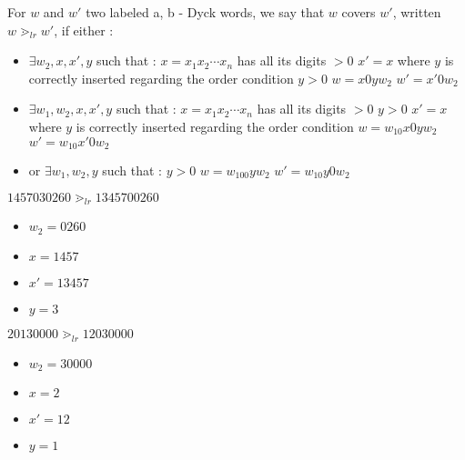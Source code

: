 \begin{definition}[$\gtrdot_{lr}$]
    For $w$ and $w'$ two labeled a, b - Dyck words, we say
    that $w$ covers $w'$, written $w \gtrdot_{lr} w'$,
    if either :
    \begin{itemize}
        \item $\exists w_2, x, x', y$ such that :
            \subitem $x = x_1x_2 \cdots x_n$ has all 
            its digits $> 0$
            \subitem $x' = x$ where $y$ is correctly
            inserted regarding the order condition
            \subitem $y > 0$
            \subitem $w = x0yw_2$
            \subitem $w' = x'0w_2$
        \item $\exists w_1, w_2, x, x', y$ such that :
            \subitem $x = x_1x_2 \cdots x_n$ has all 
                its digits $> 0$
            \subitem $y > 0$
            \subitem $x' = x$ where $y$ is correctly
                inserted regarding the order condition
            \subitem $w = w_10x0yw_2$
            \subitem $w' = w_10x'0w_2$
        \item or $\exists w_1, w_2, y$ such that :
            \subitem $y > 0$
            \subitem $w = w_100yw_2$
            \subitem $w' = w_10y0w_2$
    \end{itemize}  
\end{definition}

\begin{example}[$a > b : a = 7, b = 3$, first case]
    $1457030260 \gtrdot_{lr} 1345700260$
    \begin{itemize}
        \item $w_2 = 0260$
        \item $x = 1457$
        \item $x' = 13457$
        \item $y = 3$
    \end{itemize}
    
\end{example}

\begin{example}[$a < b : a = 3, b = 5$, first case]
    $20130000 \gtrdot_{lr} 12030000$
    \begin{itemize}
        \item $w_2 = 30000$
        \item $x = 2$
        \item $x' = 12$
        \item $y = 1$
    \end{itemize}
\end{example}

